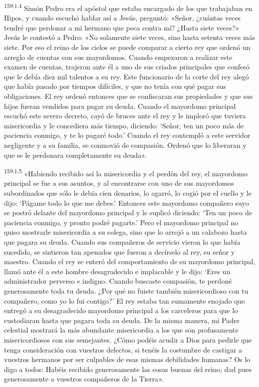 \par 
\textsuperscript{159:1.4} Simón Pedro era el apóstol que estaba encargado de los que trabajaban en Hipos, y cuando escuchó hablar así a Jesús, preguntó: «Señor, ¿cuántas veces tendré que perdonar a mi hermano que peca contra mí? ¿Hasta siete veces?» Jesús le contestó a Pedro: «No solamente siete veces, sino hasta setenta veces más siete. Por eso el reino de los cielos se puede comparar a cierto rey que ordenó un arreglo de cuentas con sus mayordomos. Cuando empezaron a realizar este examen de cuentas, trajeron ante él a uno de sus criados principales que confesó que le debía diez mil talentos a su rey. Este funcionario de la corte del rey alegó que había pasado por tiempos difíciles, y que no tenía con qué pagar sus obligaciones. El rey ordenó entonces que se confiscaran sus propiedades y que sus hijos fueran vendidos para pagar su deuda. Cuando el mayordomo principal escuchó este severo decreto, cayó de bruces ante el rey y le imploró que tuviera misericordia y le concediera más tiempo, diciendo: `Señor, ten un poco más de paciencia conmigo, y te lo pagaré todo.' Cuando el rey contempló a este servidor negligente y a su familia, se conmovió de compasión. Ordenó que lo liberaran y que se le perdonara completamente su deuda».

\par 
\textsuperscript{159:1.5} «Habiendo recibido así la misericordia y el perdón del rey, el mayordomo principal se fue a sus asuntos, y al encontrarse con uno de sus mayordomos subordinados que sólo le debía cien denarios, lo agarró, lo cogió por el cuello y le dijo: `Págame todo lo que me debes.' Entonces este mayordomo compañero suyo se postró delante del mayordomo principal y le suplicó diciendo: `Ten un poco de paciencia conmigo, y pronto podré pagarte.' Pero el mayordomo principal no quiso mostrarle misericordia a su colega, sino que lo arrojó a un calabozo hasta que pagara su deuda. Cuando sus compañeros de servicio vieron lo que había sucedido, se sintieron tan apenados que fueron a decírselo al rey, su señor y maestro. Cuando el rey se enteró del comportamiento de su mayordomo principal, llamó ante él a este hombre desagradecido e implacable y le dijo: `Eres un administrador perverso e indigno. Cuando buscaste compasión, te perdoné generosamente toda tu deuda. ¿Por qué no fuiste también misericordioso con tu compañero, como yo lo fui contigo?' El rey estaba tan sumamente enojado que entregó a su desagradecido mayordomo principal a los carceleros para que lo custodiaran hasta que pagara toda su deuda. De la misma manera, mi Padre celestial mostrará la más abundante misericordia a los que son profusamente misericordiosos con sus semejantes. ¿Cómo podéis acudir a Dios para pedirle que tenga consideración con vuestros defectos, si tenéis la costumbre de castigar a vuestros hermanos por ser culpables de esas mismas debilidades humanas? Os lo digo a todos: Habéis recibido generosamente las cosas buenas del reino; dad pues generosamente a vuestros compañeros de la Tierra».

